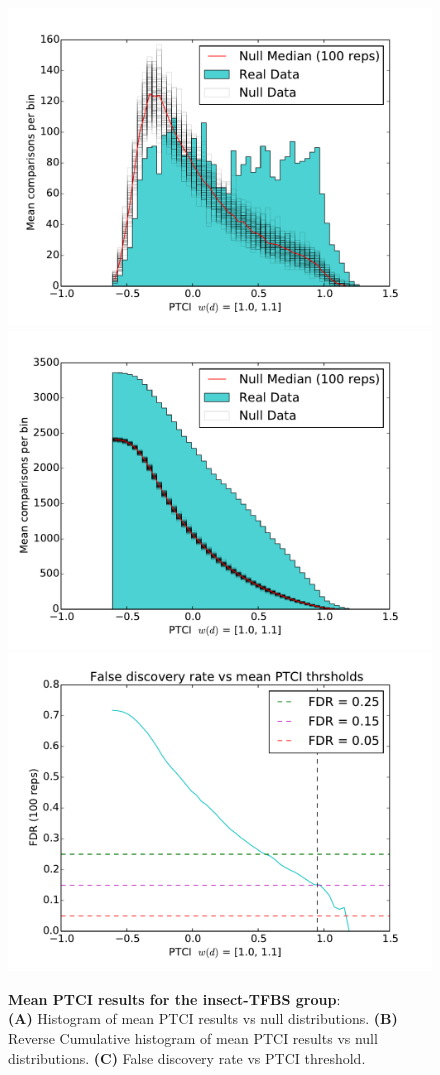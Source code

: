 
\begin{figure}[hp]
\subcaptionbox{\label{fig:insect-mean-ptci-hists-base}}
{\includegraphics[width=.5\linewidth]{figures/figs/jaspar_insect_ptci_20130918_orthodb7/mean_ptci_hist.pdf}}
% 
\subcaptionbox{\label{fig:insect-mean-ptci-hists-rcum-hist}}
{\includegraphics[width=.5\linewidth]{figures/figs/jaspar_insect_ptci_20130918_orthodb7/mean_ptci_cum_hist.pdf}}
% 
\subcaptionbox{\label{fig:insect-mean-ptci-hists-fdr}}
{\includegraphics[width=.5\linewidth]{figures/figs/jaspar_insect_ptci_20130918_orthodb7/mean_ptci_fdr.pdf}}
% 
% 
\caption[Mean insect-PTCI results]{\sf \textbf{Mean PTCI results for the insect-\gls{TFBS} group}:\\
\textbf{(A)} Histogram of mean PTCI results vs null distributions.
\textbf{(B)} Reverse Cumulative histogram of mean PTCI results vs null distributions.
\textbf{(C)} False discovery rate vs PTCI threshold.}
\label{fig:insect-mean-ptci-hists}
\end{figure}